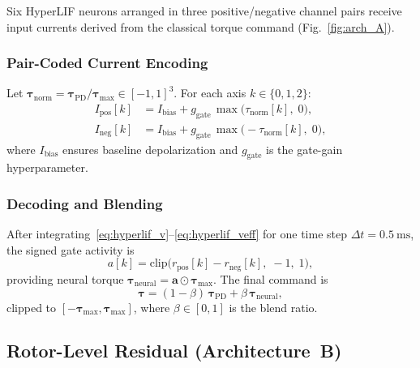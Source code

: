 \documentclass[conference]{IEEEtran}
\begin{document}
Six HyperLIF neurons arranged in three positive/negative channel pairs receive input currents derived from the classical torque command (Fig.~\ref{fig:arch_A}).

\subsubsection{Pair-Coded Current Encoding}
\label{sec:method_pair}

Let $\boldsymbol{\tau}_{\mathrm{norm}} = \boldsymbol{\tau}_{\mathrm{PD}} / \boldsymbol{\tau}_{\max} \in [-1,1]^3$.
For each axis $k \in \{0,1,2\}$:
\begin{align}
  I_{\mathrm{pos}}[k] &= I_{\mathrm{bias}} + g_{\mathrm{gate}}\,\max\!\bigl(\tau_{\mathrm{norm}}[k],\;0\bigr),
  \label{eq:pair_pos}\\
  I_{\mathrm{neg}}[k] &= I_{\mathrm{bias}} + g_{\mathrm{gate}}\,\max\!\bigl(-\tau_{\mathrm{norm}}[k],\;0\bigr),
  \label{eq:pair_neg}
\end{align}
where $I_{\mathrm{bias}}$ ensures baseline depolarization and $g_{\mathrm{gate}}$ is the gate-gain hyperparameter.

\subsubsection{Decoding and Blending}

After integrating~\eqref{eq:hyperlif_v}--\eqref{eq:hyperlif_veff} for one time step $\Delta t = \SI{0.5}{\milli\second}$, the signed gate activity is
\begin{equation}
  a[k] = \mathrm{clip}\!\bigl(r_{\mathrm{pos}}[k] - r_{\mathrm{neg}}[k],\;-1,\;1\bigr),
  \label{eq:decode}
\end{equation}
providing neural torque $\boldsymbol{\tau}_{\mathrm{neural}} = \mathbf{a} \odot \boldsymbol{\tau}_{\max}$.
The final command is
\begin{equation}
  \boldsymbol{\tau} = (1-\beta)\,\boldsymbol{\tau}_{\mathrm{PD}} + \beta\,\boldsymbol{\tau}_{\mathrm{neural}},
  \label{eq:blend_body}
\end{equation}
clipped to $[-\boldsymbol{\tau}_{\max}, \boldsymbol{\tau}_{\max}]$, where $\beta \in [0,1]$ is the blend ratio.

\subsection{Rotor-Level Residual (Architecture~B)}
\label{sec:rotor_residual}
\end{document}
